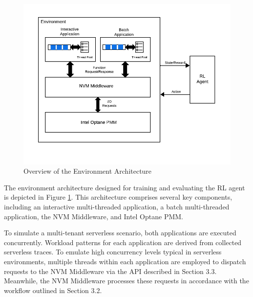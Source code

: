 \begin{figure}[ht]
  \centering
  \includegraphics[width=1\textwidth]{images/rl_environment_architecture.png}
  \caption{Overview of the Environment Architecture}
  \label{fig:rl_environment_architecture}
\end{figure}

The environment architecture designed for training and evaluating the RL agent is depicted in Figure \ref{fig:rl_environment_architecture}. This architecture comprises several key components, including an interactive multi-threaded application, a batch multi-threaded application, the NVM Middleware, and Intel Optane PMM.

To simulate a multi-tenant serverless scenario, both applications are executed concurrently. Workload patterns for each application are derived from collected serverless traces. To emulate high concurrency levels typical in serverless environments, multiple threads within each application are employed to dispatch requests to the NVM Middleware via the API described in Section 3.3. Meanwhile, the NVM Middleware processes these requests in accordance with the workflow outlined in Section 3.2.

